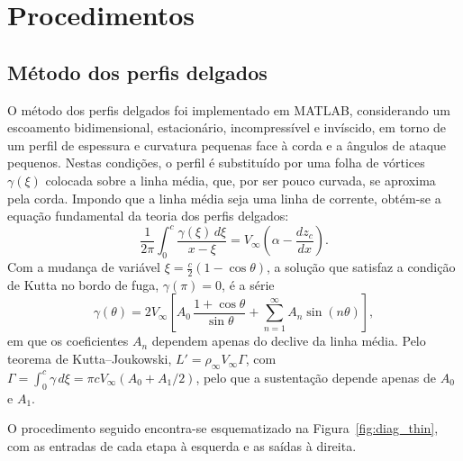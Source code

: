 \section*{Procedimentos}

\subsection*{Método dos perfis delgados}

O método dos perfis delgados foi implementado em MATLAB, considerando um
escoamento bidimensional, estacionário, incompressível e invíscido, em torno de
um perfil de espessura e curvatura pequenas face à corda e a ângulos de ataque
pequenos. Nestas condições, o perfil é substituído por uma folha de vórtices
$\gamma(\xi)$ colocada sobre a linha média, que, por ser pouco curvada, se
aproxima pela corda. Impondo que a linha média seja uma linha de corrente,
obtém-se a equação fundamental da teoria dos perfis delgados:
\[
  \frac{1}{2\pi}\int_0^c \frac{\gamma(\xi)\,d\xi}{x-\xi}
  = V_\infty\left(\alpha - \frac{dz_c}{dx}\right).
\]
Com a mudança de variável $\xi = \tfrac{c}{2}(1-\cos\theta)$, a solução que
satisfaz a condição de Kutta no bordo de fuga, $\gamma(\pi) = 0$, é a série
\[
  \gamma(\theta) = 2V_\infty\left[A_0\,\frac{1+\cos\theta}{\sin\theta}
  + \sum_{n=1}^{\infty} A_n \sin(n\theta)\right],
\]
em que os coeficientes $A_n$ dependem apenas do declive da linha média. Pelo
teorema de Kutta--Joukowski, $L' = \rho_\infty V_\infty \Gamma$, com
$\Gamma = \int_0^c \gamma\,d\xi = \pi c V_\infty (A_0 + A_1/2)$, pelo que a
sustentação depende apenas de $A_0$ e $A_1$.

O procedimento seguido encontra-se esquematizado na
Figura~\ref{fig:diag_thin}, com as entradas de cada etapa à esquerda e as saídas
à direita.

